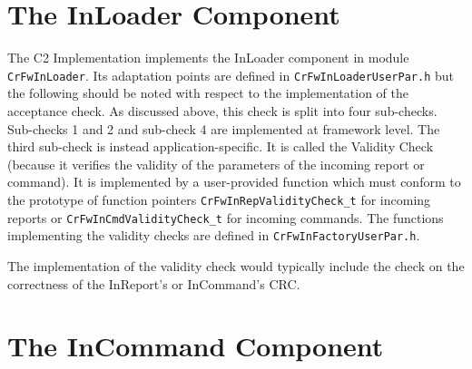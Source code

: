 \documentclass{pnp_article}
\begin{document}
\clearpage
\section{The InLoader Component}\label{sec:InLoader}


The C2 Implementation implements the InLoader component in module \texttt{CrFwInLoader}. Its adaptation points are defined in \texttt{CrFwInLoaderUserPar.h} but the following should be noted with respect to the implementation of the acceptance check. As discussed above, this check is split into four sub-checks. Sub-checks 1 and 2 and sub-check 4 are implemented at framework level. The third sub-check is instead application-specific. It is called the Validity Check (because it verifies the validity of the parameters of the incoming report or command).  It is implemented by a user-provided function which must conform to the prototype of function pointers \texttt{CrFwInRepValidityCheck\_t} for incoming reports or \texttt{CrFwInCmdValidityCheck\_t} for incoming commands. The functions implementing the validity checks are defined in \texttt{CrFwInFactoryUserPar.h}.

The implementation of the validity check would typically include the check on the correctness of the InReport's or InCommand's CRC.



\section{The InCommand Component}\label{sec:InCommand}

\end{document}
